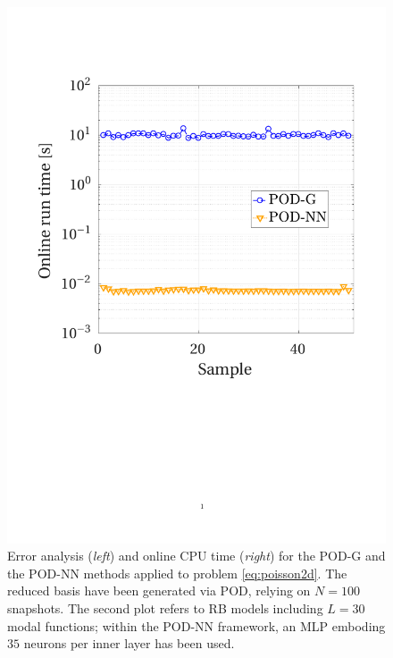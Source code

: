 \documentclass[longtitle]{elsarticle}
\numberwithin{equation}{section}
\theoremstyle{theorem}
\theoremstyle{definition}
\theoremstyle{remark}
\theoremstyle{proposition}
\numberwithin{figure}{section}
\begin{document}
\begin{figure}[t!]
			\includegraphics[scale = 0.38, trim = {1.5cm 8.95cm 1.5cm 3.8cm}, clip]{poisson2d_3_time}
			
			
			\caption{Error analysis (\emph{left}) and online CPU time (\emph{right}) for the POD-G and the POD-NN methods applied to problem \eqref{eq:poisson2d}. The reduced basis have been generated via POD, relying on $N = 100$ snapshots. The second plot refers to RB models including $L = 30$ modal functions; within the POD-NN framework, an MLP emboding $35$ neurons per inner layer has been used.}
			\label{fig:poisson2d-fig3}
			
			\vspace*{0.4cm}
			

\end{figure}
\end{document}
